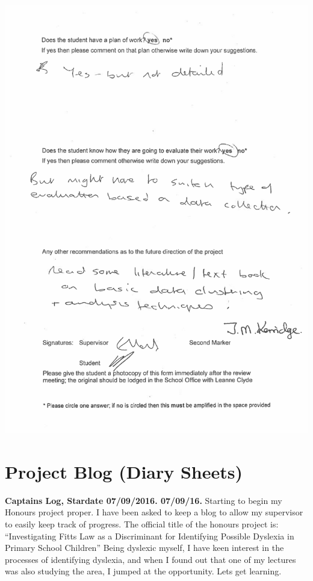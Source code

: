 \begin{appendices}
		\includegraphics[width={\textwidth}]{../images/midway_b}
		\newpage
		
	\section{Project Blog (Diary Sheets)}
		\textbf{Captains Log, Stardate 07/09/2016. 07/09/16.}
		Starting to begin my Honours project proper. I have been asked to keep a blog to allow my supervisor to easily keep track of progress.
		The official title of the honours project is:
		“Investigating Fitts Law as a Discriminant for Identifying Possible Dyslexia in Primary School Children”
		Being dyslexic myself, I have keen interest in the processes of identifying dyslexia, and when I found out that one of my lectures was also studying the area, I jumped at the opportunity.
		Lets get learning.\\
		

\end{appendices}
